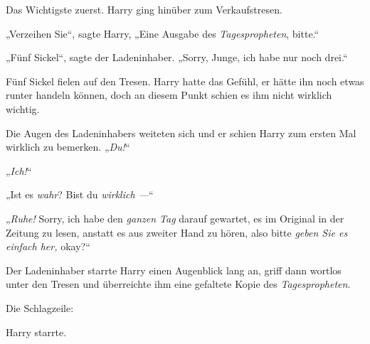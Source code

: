 Das Wichtigste zuerst. Harry ging hinüber zum Verkaufstresen.

„Verzeihen Sie“, sagte Harry,
„Eine Ausgabe des \emph{Tagespropheten}, bitte.“

„Fünf Sickel“, sagte der Ladeninhaber.
„Sorry, Junge, ich habe nur noch drei.“

Fünf Sickel fielen auf den Tresen. Harry hatte das Gefühl, er hätte ihn noch etwas runter handeln können, doch an diesem Punkt schien es ihm nicht wirklich wichtig.

Die Augen des Ladeninhabers weiteten sich und er schien Harry zum ersten Mal wirklich zu bemerken.
„\emph{Du!}“

„\emph{Ich!}“

„Ist es \emph{wahr}? Bist du \emph{wirklich —}“

„\emph{Ruhe!} Sorry, ich habe den \emph{ganzen Tag} darauf gewartet, es im Original in der Zeitung zu lesen, anstatt es aus zweiter Hand zu hören, also bitte \emph{geben Sie es einfach her,} okay?“

Der Ladeninhaber starrte Harry einen Augenblick lang an, griff dann wortlos unter den Tresen und überreichte ihm eine gefaltete Kopie des \emph{Tagespropheten}.

Die Schlagzeile:


Harry starrte.


